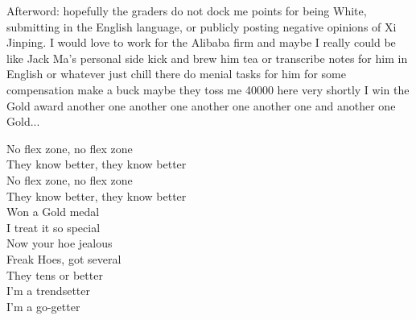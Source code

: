 Afterword: hopefully the graders do not dock me points for being White, submitting in the English language, or publicly posting negative opinions of Xi Jinping. I would love to work for the Alibaba firm and maybe I really could be like Jack Ma's personal side kick and brew him tea or transcribe notes for him in English or whatever just chill there do menial tasks for him for some compensation make a buck maybe they toss me 40000 here very shortly I win the Gold award another one another one another one another one and another one Gold...

No flex zone, no flex zone \\
They know better, they know better \\
No flex zone, no flex zone \\
They know better, they know better \\
Won a Gold medal \\
I treat it so special \\
Now your hoe jealous \\
Freak Hoes, got several \\
They tens or better \\
I'm a trendsetter \\
I'm a go-getter